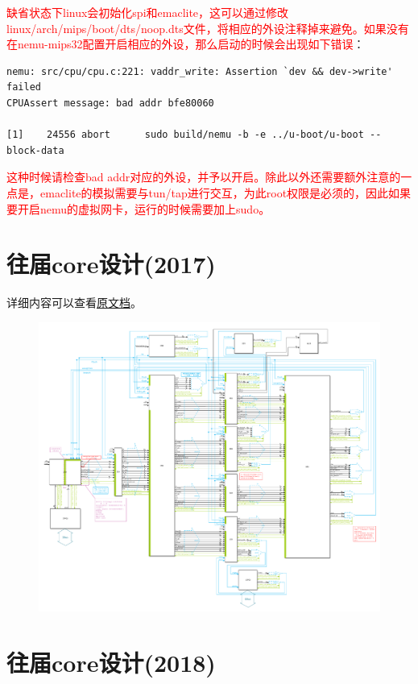 \documentclass[lang=cn,11pt,a4paper]{elegantpaper}
\begin{document}
\textcolor{red}{缺省状态下linux会初始化spi和emaclite，这可以通过修改linux/arch/mips/boot/dts/noop.dts文件，将相应的外设注释掉来避免。如果没有在nemu-mips32配置开启相应的外设，那么启动的时候会出现如下错误}：
\begin{lstlisting}
nemu: src/cpu/cpu.c:221: vaddr_write: Assertion `dev && dev->write' failed
CPUAssert message: bad addr bfe80060

[1]    24556 abort      sudo build/nemu -b -e ../u-boot/u-boot --block-data
\end{lstlisting}
\textcolor{red}{这种时候请检查bad addr对应的外设，并予以开启。除此以外还需要额外注意的一点是，emaclite的模拟需要与tun/tap进行交互，为此root权限是必须的，因此如果要开启nemu的虚拟网卡，运行的时候需要加上sudo。}

\section{往届core设计(2017)}

详细内容可以查看\href{run:../manuals/2017-I4-NOOP.pdf}{原文档}。

\begin{figure}[H]
\centering
\includegraphics[width=\linewidth]{image/core-I4-2017}
\end{figure}

\section{往届core设计(2018)}
\end{document}
